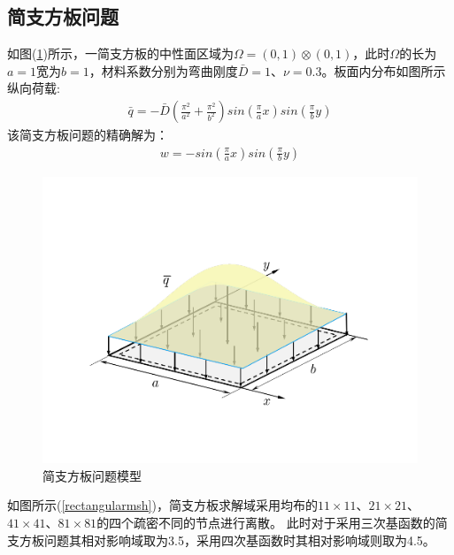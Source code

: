 \subsection{简支方板问题}
如图(\ref{rectangular})所示，一简支方板的中性面区域为$\Omega=(0,1)\otimes(0,1)$，此时$\Omega$的长为$a=1$宽为$b=1$，材料系数分别为弯曲刚度$\bar{D}=1$、$\nu=0.3$。板面内分布如图所示纵向荷载:
\begin{equation}
\begin{split}
    \bar q=-\bar D(\frac{\pi^2}{a^2}+\frac{\pi^2}{b^2})sin(\frac{\pi}{a}x)sin(\frac{\pi}{b}y)
\end{split}
\end{equation}
该简支方板问题的精确解为：
\begin{equation}
\begin{split}
    w=-sin(\frac{\pi}{a}x)sin(\frac{\pi}{b}y)
\end{split}
\end{equation}
\begin{figure}[H]
\centering
    \includegraphics[scale=0.7]{figure/PHR/R/rectangular.png}
    \caption{简支方板问题模型}\label{rectangular}
\end{figure}
如图所示(\ref{rectangularmsh})，简支方板求解域采用均布的$11\times 11$、$21\times 21$、$41\times 41$、$81\times 81$的四个疏密不同的节点进行离散。
此时对于采用三次基函数的简支方板问题其相对影响域取为3.5，采用四次基函数时其相对影响域则取为4.5。\par

